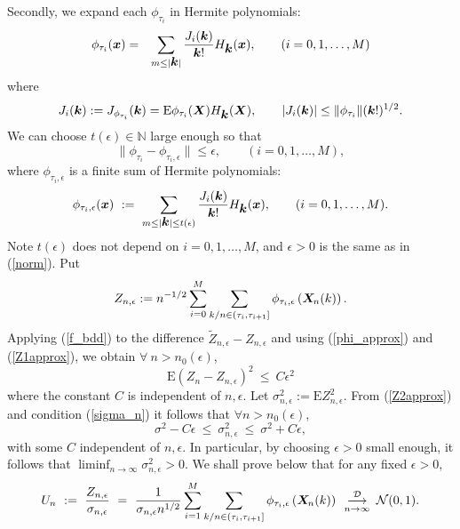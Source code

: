\documentclass[10pt]{article}
\def\N{\mathbb{N}}
\def\E{\mathrm E}
\newcommand{\mbf}[1]{\mbox{\boldmath $#1$}}
\def\limiteloin{\renewcommand{\arraystretch}{0.5}
\begin{array}[t]{c}
\stackrel{{\cal D}}{\longrightarrow} \\
{\scriptstyle n \rightarrow\infty}
\end{array}\renewcommand{\arraystretch}{1}}
\begin{document}
Secondly, we expand each $\phi_{\tau_i}$ in Hermite polynomials:
\begin{eqnarray}
\phi_{\tau_i}({\mbf x})&=& \sum_{m \le |{\mbf k}|} \frac{J_i({\mbf
k})}{{\mbf k}!} H_{\mbf k}({\mbf x}),  \qquad (i=0,1, \dots, M)
\end{eqnarray}
where
$$
J_i({\mbf k}) := J_{\phi_{\tau_i}}({\mbf k}) =  \E
\phi_{\tau_i}({\mbf X}) H_{\mbf k}({\mbf X}), \qquad |J_i({\mbf k})|
\le   \|\phi_{\tau_i}\| ({\mbf k}!)^{1/2}.
$$
We can choose $t(\epsilon) \in {\N}$ large enough so that
\begin{equation}
\|\phi_{\tau_i} - \phi_{\tau_i, \epsilon}\| \le \epsilon, \qquad
(i=0,1, \dots, M), \label{phi_approx}
\end{equation}
where $\phi_{\tau_i, \epsilon}$ is a finite sum of Hermite
polynomials:
\begin{equation}
\phi_{\tau_i, \epsilon}({\mbf x}) \ := \  \sum_{m \le |{\mbf k}|
\le t(\epsilon)} \frac{J_i({\mbf k})}{{\mbf k}!} H_{\mbf k}({\mbf
x}),  \qquad (i=0,1, \dots, M).
\end{equation}
Note $t(\epsilon) $ does not depend on $i=0,1,\dots, M$, and
$\epsilon>0$ is the same as in (\ref{norm}). Put
\begin{equation}
Z_{n,\epsilon} := n^{-1/2} \sum_{i=0}^M \sum_{k/n \in (\tau_i,
\tau_{i+1}]} \phi_{\tau_i, \epsilon}\left({\mbf X}_{\!
n}(k)\right).  \label{Z_epsilon}
\end{equation}
Applying (\ref{f_bdd}) to the difference $\widetilde
Z_{n,\epsilon} - Z_{n,\epsilon}$ and using (\ref{phi_approx}) and
(\ref{Z1approx}), we obtain $\forall \  n> n_0(\epsilon)$,
\begin{equation}
\E (Z_n - Z_{n,\epsilon})^2 \  \le \   C \epsilon^2
\label{Z2approx}
\end{equation}
where the constant $C$ is independent of $n, \epsilon $.  Let
$\sigma^2_{n,\epsilon} :=  \E Z^2_{n,\epsilon}$. From
(\ref{Z2approx}) and condition (\ref{sigma_n}) it follows that
$\forall n>n_0(\epsilon)$,
\begin{equation}
\sigma^2 - C \epsilon \  \le \  \sigma^2_{n,\epsilon}  \ \le \
\sigma^2 + C \epsilon,
 \label{sigma_sigma}
\end{equation}
with some $C$ independent of $n, \epsilon $. In particular, by
choosing $\epsilon >0$ small enough, it follows that $\liminf_{n
\to \infty} \sigma^2_{n,\epsilon} > 0$. We shall prove below that
for any fixed $\epsilon >0$,
\begin{equation}
U_n \ := \  \frac{Z_{n,\epsilon} }{\sigma_{n,\epsilon}} \ =  \
\frac{1} {\sigma_{n, \epsilon} n^{1/2}} \sum_{i=1}^M \sum_{k/n \in
(\tau_i, \tau_{i+1}]} \phi_{\tau_i, \epsilon} \left({\mbf X}_{\!
n}(k)\right) \limiteloin {\mathcal N}(0,1).
 \label{CLT2}
\end{equation}
\end{document}
